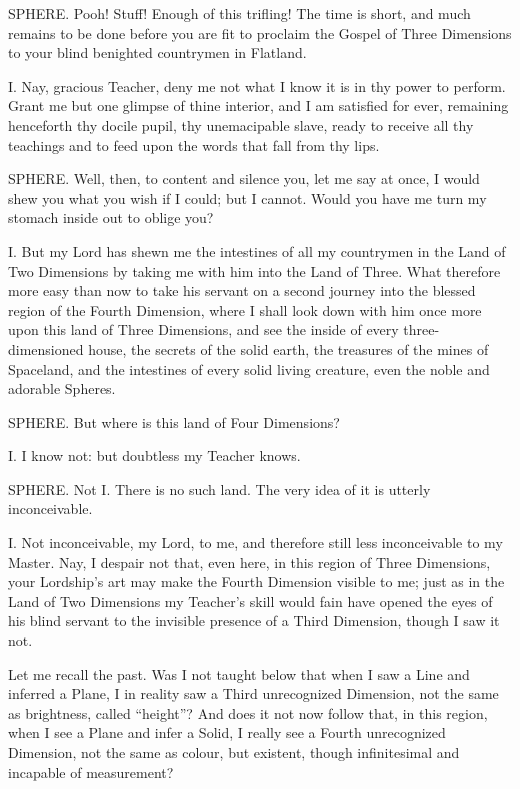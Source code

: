 \documentclass[12pt, a4paper, twoside]{memoir}
\begin{document}
SPHERE. Pooh! Stuff! Enough of this trifling! The time is short, and much
remains to be done before you are fit to proclaim the Gospel of Three
Dimensions to your blind benighted countrymen in Flatland.

I. Nay, gracious Teacher, deny me not what I know it is in thy power to
perform. Grant me but one glimpse of thine interior, and I am satisfied for
ever, remaining henceforth thy docile pupil, thy unemacipable slave, ready to
receive all thy teachings and to feed upon the words that fall from thy lips.

SPHERE. Well, then, to content and silence you, let me say at once, I would
shew you what you wish if I could; but I cannot. Would you have me turn my
stomach inside out to oblige you?

I. But my Lord has shewn me the intestines of all my countrymen in the Land of
Two Dimensions by taking me with him into the Land of Three. What therefore
more easy than now to take his servant on a second journey into the blessed
region of the Fourth Dimension, where I shall look down with him once more
upon this land of Three Dimensions, and see the inside of every
three-dimensioned house, the secrets of the solid earth, the treasures of the
mines of Spaceland, and the intestines of every solid living creature, even
the noble and adorable Spheres.

SPHERE. But where is this land of Four Dimensions?

I. I know not: but doubtless my Teacher knows.

SPHERE. Not I. There is no such land. The very idea of it is utterly
inconceivable.

I. Not inconceivable, my Lord, to me, and therefore still less inconceivable
to my Master. Nay, I despair not that, even here, in this region of Three
Dimensions, your Lordship's art may make the Fourth Dimension visible to me;
just as in the Land of Two Dimensions my Teacher's skill would fain have
opened the eyes of his blind servant to the invisible presence of a Third
Dimension, though I saw it not.

Let me recall the past. Was I not taught below that when I saw a Line and
inferred a Plane, I in reality saw a Third unrecognized Dimension, not the
same as brightness, called ``height''? And does it not now follow that, in this
region, when I see a Plane and infer a Solid, I really see a Fourth
unrecognized Dimension, not the same as colour, but existent, though
infinitesimal and incapable of measurement?
\end{document}
